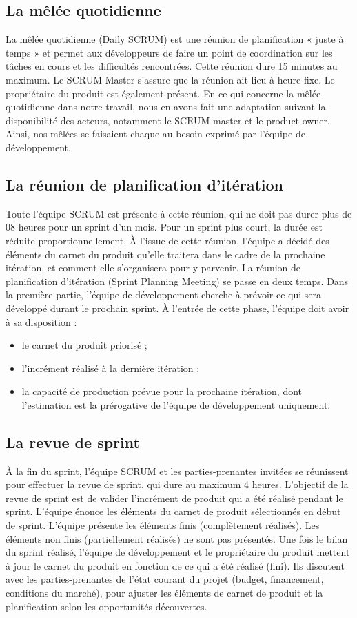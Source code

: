 \documentclass[a4paper,12pt]{book}
\theoremstyle{break}
\begin{document}
\subsection{La mêlée quotidienne}
La mêlée quotidienne (Daily SCRUM) est une réunion de planification « juste à temps » et permet aux développeurs de faire un point de coordination sur les tâches en cours et les difficultés rencontrées. Cette réunion dure 15 minutes au maximum. Le SCRUM Master s'assure que la réunion ait lieu à heure fixe. Le propriétaire du produit est également présent.
En ce qui concerne la mêlée quotidienne dans notre travail, nous en avons fait une adaptation suivant la disponibilité des acteurs, notamment le SCRUM master et le product owner. Ainsi, nos mêlées se faisaient chaque au besoin exprimé par l’équipe de développement.


\subsection{La réunion de planification d'itération}
Toute l'équipe SCRUM est présente à cette réunion, qui ne doit pas durer plus de 08 heures pour un sprint d'un mois. Pour un sprint plus court, la durée est réduite proportionnellement. À l'issue de cette réunion, l'équipe a décidé des éléments du carnet du produit qu'elle traitera dans le cadre de la prochaine itération, et comment elle s'organisera pour y parvenir.
La réunion de planification d'itération (Sprint Planning Meeting) se passe en deux temps. Dans la première partie, l'équipe de développement cherche à prévoir ce qui sera développé durant le prochain sprint. À l'entrée de cette phase, l'équipe doit avoir à sa disposition :
\begin{itemize}
    \item le carnet du produit priorisé ;
    \item l'incrément réalisé à la dernière itération ;
    \item la capacité de production prévue pour la prochaine itération, dont l'estimation est la prérogative de l'équipe de développement uniquement.
\end{itemize}

\subsection{La revue de sprint}
À la fin du sprint, l'équipe SCRUM et les parties-prenantes invitées se réunissent pour effectuer la revue de sprint, qui dure au maximum 4 heures. L'objectif de la revue de sprint est de valider l'incrément de produit qui a été réalisé pendant le sprint. L'équipe énonce les éléments du carnet de produit sélectionnés en début de sprint. L'équipe présente les éléments finis (complètement réalisés). Les éléments non finis (partiellement réalisés) ne sont pas présentés.
Une fois le bilan du sprint réalisé, l'équipe de développement et le propriétaire du produit mettent à jour le carnet du produit en fonction de ce qui a été réalisé (fini). Ils discutent avec les parties-prenantes de l'état courant du projet (budget, financement, conditions du marché), pour ajuster les éléments de carnet de produit et la planification selon les opportunités découvertes.
\end{document}
